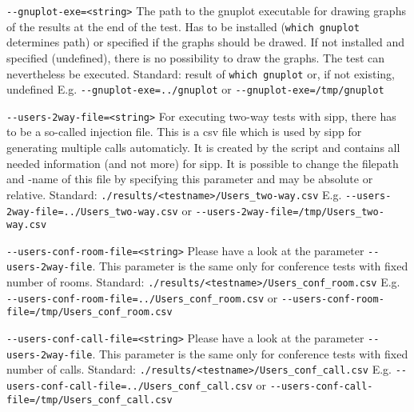 \begin{description}
\item {\texttt{-{}-gnuplot-exe=<string>}} \newline
The path to the gnuplot executable for drawing graphs of the results at the end of the test.
Has to be installed (\texttt{which gnuplot} determines path) or specified if the graphs
should be drawed. If not installed and specified (undefined), there is no possibility to
draw the graphs. The test can nevertheless be executed.
\newline Standard: result of \texttt{which gnuplot} or, if not existing, undefined
\newline E.g. \texttt{-{}-gnuplot-exe=../gnuplot} or \texttt{-{}-gnuplot-exe=/tmp/gnuplot}

\item {\texttt{-{}-users-2way-file=<string>}} \newline
For executing two-way tests with sipp, there has to be a so-called injection file.
This is a csv file which is used by sipp for generating multiple calls automaticly.
It is created by the script and contains all needed information (and not more)
for sipp. It is possible to change the filepath and -name of this file by specifying
this parameter and may be absolute or relative.
\newline Standard: \texttt{./results/<testname>/Users\_two-way.csv}
\newline E.g. \texttt{-{}-users-2way-file=../Users\_two-way.csv}
\newline or \texttt{-{}-users-2way-file=/tmp/Users\_two-way.csv}

\item {\texttt{-{}-users-conf-room-file=<string>}} \newline
Please have a look at the parameter \texttt{-{}-users-2way-file}.
This parameter is the same only for conference tests with fixed number of rooms.
\newline Standard: \texttt{./results/<testname>/Users\_conf\_room.csv}
\newline E.g. \texttt{-{}-users-conf-room-file=../Users\_conf\_room.csv}
\newline or \texttt{-{}-users-conf-room-file=/tmp/Users\_conf\_room.csv}

\item {\texttt{-{}-users-conf-call-file=<string>}} \newline
Please have a look at the parameter \texttt{-{}-users-2way-file}.
This parameter is the same only for conference tests with fixed number of calls.
\newline Standard: \texttt{./results/<testname>/Users\_conf\_call.csv}
\newline E.g. \texttt{-{}-users-conf-call-file=../Users\_conf\_call.csv}
\newline or \texttt{-{}-users-conf-call-file=/tmp/Users\_conf\_call.csv}


\end{description}
